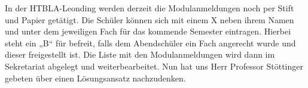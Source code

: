 In der HTBLA-Leonding werden derzeit die Modulanmeldungen noch per Stift und Papier getätigt. 
Die Schüler können sich mit einem X neben ihrem Namen und unter dem jeweiligen Fach für das kommende Semester eintragen. 
Hierbei steht ein „B“ für befreit, falls dem Abendschüler ein Fach angerecht wurde und dieser freigestellt ist. 
Die Liste mit den Modulanmeldungen wird dann im Sekretariat abgelegt und weiterbearbeitet. 
Nun hat uns Herr Professor Stöttinger gebeten über einen Lösungsansatz nachzudenken. 